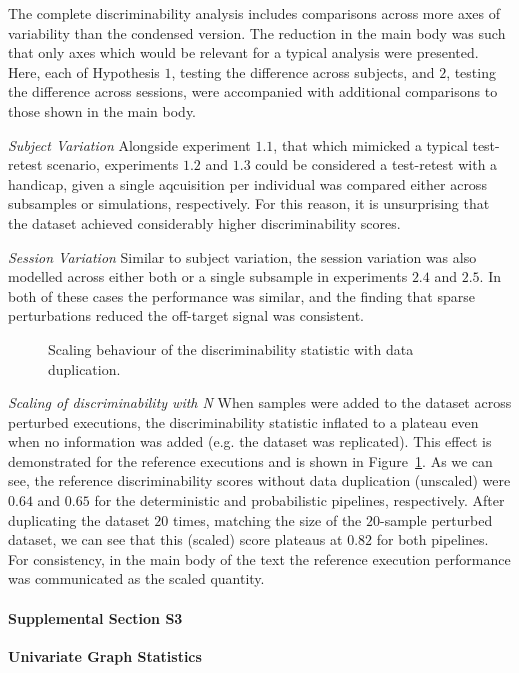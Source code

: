 \documentclass[10pt,letterpaper]{article}
\begin{document}
The complete discriminability analysis includes comparisons across more axes of
variability than the condensed version. The reduction in the main body was such that
only axes which would be relevant for a typical analysis were presented. Here, each
of Hypothesis $1$, testing the difference across subjects, and $2$, testing the
difference across sessions, were accompanied with additional comparisons to those
shown in the main body.

\textit{Subject Variation}
Alongside experiment $1.1$, that which mimicked a typical test-retest scenario,
experiments $1.2$ and $1.3$ could be considered a test-retest with a handicap, given
a single aqcuisition per individual was compared either across subsamples or
simulations, respectively. For this reason, it is unsurprising that the dataset
achieved considerably higher discriminability scores. 

\textit{Session Variation}
Similar to subject variation, the session variation was also modelled across either
both or a single subsample in experiments $2.4$ and $2.5$. In both of these cases
the performance was similar, and the finding that sparse perturbations reduced the
off-target signal was consistent.

\begin{figure}[ht]\centering
\caption{Scaling behaviour of the discriminability statistic with data duplication.}
\label{fig:discrim_scaling}
\end{figure}

\textit{Scaling of discriminability with N}
When samples were added to the dataset across perturbed executions, the
discriminability statistic inflated to a plateau even when no information was added
(e.g. the dataset was replicated). This effect is demonstrated for the reference
executions and is shown in Figure~\ref{fig:discrim_scaling}. As we can see, the
reference discriminability scores without data duplication (unscaled) were $0.64$
and $0.65$ for the deterministic and probabilistic pipelines, respectively. After
duplicating the dataset $20$ times, matching the size of the $20$-sample perturbed
dataset, we can see that this (scaled) score plateaus at $0.82$ for both pipelines.
For consistency, in the main body of the text the reference execution performance
was communicated as the scaled quantity.

\paragraph*{Supplemental Section S3}
\label{supsec:univar}
{\bf Univariate Graph Statistics}
\end{document}
